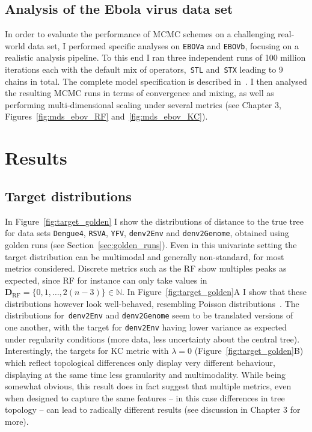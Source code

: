 \subsection{Analysis of the Ebola virus data set}

In order to evaluate the performance of MCMC schemes on a challenging real-world data set, I performed specific analyses on \verb|EBOVa| and \verb|EBOVb|, focusing on a realistic analysis pipeline.
To this end I ran three independent runs of 100 million iterations each with the default mix of operators,~\verb|STL| and~\verb|STX| leading to 9 chains in total.
The complete model specification is described in~\cite{Dudas2017}.
I then analysed the resulting MCMC runs in terms of convergence and mixing, as well as performing multi-dimensional scaling under several metrics (see Chapter 3, Figures~\ref{fig:mds_ebov_RF} and~\ref{fig:mds_ebov_KC}).

\section{Results}

\subsection{Target distributions}
\label{sec:target}

In Figure~\ref{fig:target_golden} I show the distributions of distance to the true tree for data sets \verb|Dengue4|, \verb|RSVA|, \verb|YFV|, \verb|denv2Env| and \verb|denv2Genome|, obtained using golden runs (see Section~\ref{sec:golden_runs}).
Even in this univariate setting the target distribution can be multimodal and generally non-standard, for most metrics considered.
Discrete metrics such as the RF show multiples peaks as expected, since RF for instance can only take values in $\boldsymbol D_{\text{RF}} = \{0, 1, \ldots, 2(n-3) \} \in \mathbb{N} $.
In Figure~\ref{fig:target_golden}A I show that these distributions however look well-behaved, resembling Poisson distributions~\citep{Bryant2009}.
The distributions for~\verb|denv2Env| and \verb|denv2Genome| seem to be translated versions of one another, with the target for \verb|denv2Env| having lower variance as expected under regularity conditions (more data, less uncertainty about the central tree). 
Interestingly, the targets for KC metric with $\lambda = 0$ (Figure~\ref{fig:target_golden}B)  which reflect topological differences only display very different behaviour, displaying at the same time less granularity and multimodality.
While being somewhat obvious, this result does in fact suggest that multiple metrics, even when designed to capture the same features -- in this case differences in tree topology -- can lead to radically different results (see discussion in Chapter 3 for more).

